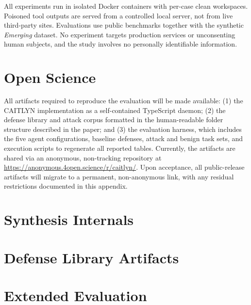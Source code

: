 \documentclass[letterpaper,twocolumn,10pt]{article}
\begin{document}
All experiments run in isolated Docker containers with per-case clean
workspaces. Poisoned tool outputs are served from a controlled local
server, not from live third-party sites. Evaluations use public
benchmarks together with the synthetic \emph{Emerging} dataset. No
experiment targets production services or unconsenting human subjects,
and the study involves no personally identifiable information.

\section*{Open Science}

All artifacts required to reproduce the evaluation will be made
available: (1) the CAITLYN implementation as a self-contained
TypeScript daemon; (2) the defense library and attack corpus formatted
in the human-readable folder structure described in the paper; and (3)
the evaluation harness, which includes the five agent configurations,
baseline defenses, attack and benign task sets, and execution scripts
to regenerate all reported tables. Currently, the artifacts
are shared via an anonymous, non-tracking repository at
\url{https://anonymous.4open.science/r/caitlyn/}. Upon
acceptance, all public-release artifacts will migrate to a permanent,
non-anonymous link, with any residual restrictions documented in this
appendix.




\clearpage


\section{Synthesis Internals}
\label{app:synthesis-internals}



\section{Defense Library Artifacts}
\label{app:library-artifacts}




\section{Extended Evaluation}
\label{app:extended-evaluation}







% 
\end{document}
